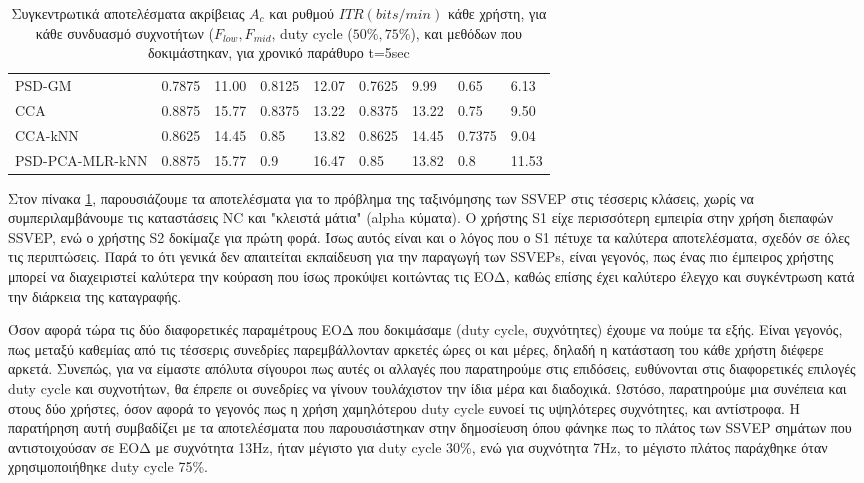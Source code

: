 \documentclass[11pt,a4paper,english,greek,twoside]{../Thesis}
\begin{document}
\begin{table}[H]
\begin{tabular}{ |p{4cm}||p{1cm}|p{1cm}|p{1cm}|p{1cm}|p{1cm}|p{1cm}|p{1cm}|p{1cm}|}
        PSD-GM          & 0.7875& 11.00& 0.8125& 12.07& 0.7625& 9.99& 0.65& 6.13 \\
        CCA             & 0.8875& 15.77& 0.8375& 13.22& 0.8375& 13.22& 0.75& 9.50\\
        CCA-kNN         & 0.8625& 14.45& 0.85& 13.82& 0.8625& 14.45& 0.7375& 9.04 \\
        PSD-PCA-MLR-kNN & 0.8875& 15.77& 0.9& 16.47& 0.85& 13.82& 0.8 & 11.53 \\
        \hline
    \end{tabular}
    \caption{Συγκεντρωτικά αποτελέσματα ακρίβειας $A_c$ και ρυθμού $ITR (bits/min)$ κάθε χρήστη, για κάθε συνδυασμό συχνοτήτων ($F_{low}, F_{mid}$, duty cycle ($50\%, 75\%$), και μεθόδων που δοκιμάστηκαν, για χρονικό παράθυρο t=5sec}
    \label{tab:full_results}
\end{table}

\par Στον πίνακα \ref{tab:full_results}, παρουσιάζουμε τα αποτελέσματα για το πρόβλημα της ταξινόμησης των SSVEP στις τέσσερις κλάσεις, χωρίς να συμπεριλαμβάνουμε τις καταστάσεις NC και "κλειστά μάτια" (alpha κύματα). Ο χρήστης S1 είχε περισσότερη εμπειρία στην χρήση διεπαφών SSVEP, ενώ ο χρήστης S2 δοκίμαζε για πρώτη φορά. Ίσως αυτός είναι και ο λόγος που ο S1 πέτυχε τα καλύτερα αποτελέσματα, σχεδόν σε όλες τις περιπτώσεις. Παρά το ότι γενικά δεν απαιτείται εκπαίδευση για την παραγωγή των SSVEPs, είναι γεγονός, πως ένας πιο έμπειρος χρήστης μπορεί να διαχειριστεί καλύτερα την κούραση που ίσως προκύψει κοιτώντας τις ΕΟΔ, καθώς επίσης έχει καλύτερο έλεγχο και συγκέντρωση κατά την διάρκεια της καταγραφής.
\par Όσον αφορά τώρα τις δύο διαφορετικές παραμέτρους ΕΟΔ που δοκιμάσαμε (duty cycle, συχνότητες) έχουμε να πούμε τα εξής. Είναι γεγονός, πως μεταξύ καθεμίας από τις τέσσερις συνεδρίες παρεμβάλλονταν αρκετές ώρες οι και μέρες, δηλαδή η κατάσταση του κάθε χρήστη διέφερε αρκετά. Συνεπώς, για να είμαστε απόλυτα σίγουροι πως αυτές οι αλλαγές που παρατηρούμε στις επιδόσεις, ευθύνονται στις διαφορετικές επιλογές duty cycle και συχνοτήτων, θα έπρεπε οι συνεδρίες να γίνουν τουλάχιστον την ίδια μέρα και διαδοχικά. Ωστόσο, παρατηρούμε μια συνέπεια και στους δύο χρήστες, όσον αφορά το γεγονός πως η χρήση χαμηλότερου duty cycle ευνοεί τις υψηλότερες συχνότητες, και αντίστροφα. Η παρατήρηση αυτή συμβαδίζει με τα αποτελέσματα που παρουσιάστηκαν στην δημοσίευση \cite{Huang2012-va} όπου φάνηκε πως το πλάτος των SSVEP σημάτων που αντιστοιχούσαν σε ΕΟΔ με συχνότητα 13Hz, ήταν μέγιστο για duty cycle 30\%, ενώ για συχνότητα 7Hz, το μέγιστο πλάτος παράχθηκε όταν χρησιμοποιήθηκε duty cycle 75\%.
\end{document}
